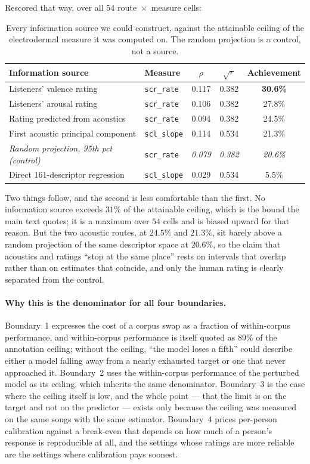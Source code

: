 Rescored that way, over all $54$ route~$\times$~measure cells:

\begin{table}[htbp]
\centering\small
\caption{Every information source we could construct, against the attainable ceiling
of the electrodermal measure it was computed on. The random projection is a control,
not a source.}
\begin{tabular}{llccc}
\toprule
Information source & Measure & $\rho$ & $\sqrt{r}$ & Achievement \\
\midrule
Listeners' valence rating & \texttt{scr\_rate} & 0.117 & 0.382 & \textbf{30.6\%} \\
Listeners' arousal rating & \texttt{scr\_rate} & 0.106 & 0.382 & 27.8\% \\
Rating predicted from acoustics & \texttt{scr\_rate} & 0.094 & 0.382 & 24.5\% \\
First acoustic principal component & \texttt{scl\_slope} & 0.114 & 0.534 & 21.3\% \\
\midrule
\emph{Random projection, 95th pct (control)} & \texttt{scr\_rate} & \emph{0.079} & \emph{0.382} & \emph{20.6\%} \\
\midrule
Direct 161-descriptor regression & \texttt{scl\_slope} & 0.029 & 0.534 & 5.5\% \\
\bottomrule
\end{tabular}
\end{table}

Two things follow, and the second is less comfortable than the first. No information
source exceeds $31\%$ of the attainable ceiling, which is the bound the main text
quotes; it is a maximum over $54$ cells and is biased upward for that reason. But the
two acoustic routes, at $24.5\%$ and $21.3\%$, sit barely above a random projection of
the same descriptor space at $20.6\%$, so the claim that acoustics and ratings
``stop at the same place'' rests on intervals that overlap rather than on estimates
that coincide, and only the human rating is clearly separated from the control.

\paragraph{Why this is the denominator for all four boundaries.}
Boundary~1 expresses the cost of a corpus swap as a fraction of within-corpus
performance, and within-corpus performance is itself quoted as 89\% of the annotation
ceiling; without the ceiling, ``the model loses a fifth'' could describe either a
model falling away from a nearly exhausted target or one that never approached it.
Boundary~2 uses the within-corpus performance of the perturbed model as its ceiling,
which inherits the same denominator. Boundary~3 is the case where the ceiling itself
is low, and the whole point --- that the limit is on the target and not on the
predictor --- exists only because the ceiling was measured on the same songs with the
same estimator. Boundary~4 prices per-person calibration against a break-even that
depends on how much of a person's response is reproducible at all, and the settings
whose ratings are more reliable are the settings where calibration pays soonest.

